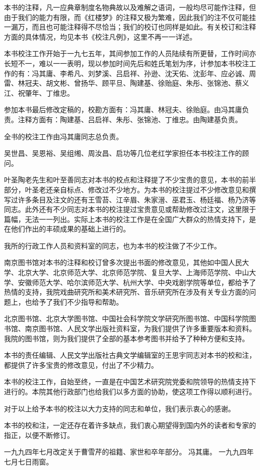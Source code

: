 \par 本书的注释，凡一应典章制度名物典故以及难解之语词，一般均尽可能作注释，但由于我们的能力有限，而《红楼梦》的注释又极为繁难，因此我们的注不仅可能挂一漏万，而且也可能注释得不尽恰当；我们的校订也同样是如此。有关校订和注释方面的具体情况，均见本书《校注凡例》，这里不再一一详述。
\par 本书校注工作开始于一九七五年，其间参加工作的人员陆续有所更替，工作时间亦长短不一，难以一一表明，现以参加时间先后和姓氏笔划为序，计参加本书校注工作的有：冯其庸、李希凡、刘梦溪、吕启祥、孙逊、沈天佑、沈彭年、应必诚、周雷、林冠夫、胡文彬、曾扬华、顾平旦、陶建基、徐贻庭、朱彤、张锦池、蔡义江、祝肇年、丁维忠。
\par 参加本书最后修改定稿的，校勘方面有：冯其庸、林冠夫、徐贻庭。由冯其庸负责。注释方面有：陶建基、吕启祥、朱彤、张锦池、丁维忠。由陶建基负责。
\par 全书的校注工作由冯其庸同志总负责。
\par 吴世昌、吴恩裕、吴组缃、周汝昌、启功等几位老红学家担任本书校注工作的顾问。
\par 叶圣陶老先生和叶至善同志对本书的校点和注释提了不少宝贵的意见，本书的前半部分，叶圣老还亲自标点、修改过不少地方。为本书的校注提过不少修改意见和撰写过许多条目及注文的还有王雪苔、江辛眉、朱家溍、巫君玉、杨廷福、杨乃济等同志。此外还有不少同志对本书的校注提过宝贵意见或帮助修改过注文，这里限于篇幅，无法一一列出。实际上本书的校注工作是在全国广大群众的热情支持下，是在他们作出的丰硕成果的基础上进行的。
\par 我所的行政工作人员和资料室的同志，也为本书的校注做了不少工作。
\par 南京图书馆对本书的注释和校订曾多次提出书面的修改意见，其他如中国人民大学、北京大学、北京师范大学、北京师范学院、复旦大学、上海师范学院、中山大学、安徽师范大学、哈尔滨师范大学、杭州大学、中央戏剧学院等单位，都给予了热情的支持，我院戏曲研究所和美术研究所、音乐研究所在涉及有关专业方面的问题上，也给予了我们不少指导和帮助。
\par 北京图书馆、北京大学图书馆、中国社会科学院文学研究所图书馆、中国科学院图书馆、南京图书馆、人民文学出版社资料室，为我们提供了许多重要版本和资料。我院的图书馆，则为我们提供了全部的基本参考图书并给予了种种方便和支持。
\par 本书的责任编辑、人民文学出版社古典文学编辑室的王思宇同志对本书的校和注，都提供了许多宝贵的修改意见，付出了不少精力。
\par 本书的校注工作，自始至终，一直是在中国艺术研究院党委和院领导的热情支持下进行的。本院其他行政部门也给我们以多方面的协助，使这项工作得以顺利进行。
\par 对于以上给予本书的校注以大力支持的同志和单位，我们表示衷心的感谢。
\par 本书的校和注，一定还存在着许多缺点，我们衷心期望得到国内外的读者和专家的指正，以便不断修订。
\par {}
\par {}
\par 一九九四年七月改定关于曹雪芹的祖籍、家世和卒年部分。 冯其庸。 一九九四年七月七日雨窗。


